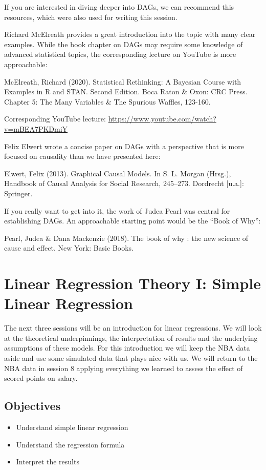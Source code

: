 \documentclass[
]{book}
\providecommand{\tightlist}{%
  \setlength{\itemsep}{0pt}\setlength{\parskip}{0pt}}
\begin{document}
If you are interested in diving deeper into DAGs, we can recommend this
resources, which were also used for writing this session.

Richard McElreath provides a great introduction into the topic with many clear
examples. While the book chapter on DAGs may require some knowledge of advanced
statistical topics, the corresponding lecture on YouTube is more approachable:

McElreath, Richard (2020). Statistical Rethinking: A Bayesian Course with
Examples in R and STAN. Second Edition. Boca Raton \& Oxon: CRC Press.
Chapter 5: The Many Variables \& The Spurious Waffles, 123-160.

Corresponding YouTube lecture: \url{https://www.youtube.com/watch?v=mBEA7PKDmiY}

Felix Elwert wrote a concise paper on DAGs with a perspective that is more
focused on causality than we have presented here:

Elwert, Felix (2013). Graphical Causal Models. In S. L. Morgan (Hrsg.), Handbook
of Causal Analysis for Social Research, 245--273. Dordrecht {[}u.a.{]}: Springer.

If you really want to get into it, the work of Judea Pearl was central for
establishing DAGs. An approachable starting point would be the ``Book of Why'':

Pearl, Judea \& Dana Mackenzie (2018). The book of why : the new science of cause
and effect. New York: Basic Books.

\hypertarget{lin-t-1}{%
\chapter{Linear Regression Theory I: Simple Linear Regression}\label{lin-t-1}}

The next three sessions will be an introduction for linear regressions.
We will look at the theoretical underpinnings, the interpretation of results
and the underlying assumptions of these models. For this introduction we will
keep the NBA data aside and use some simulated data that plays nice with us.
We will return to the NBA data in session 8 applying everything we
learned to assess the effect of scored points on salary.

\hypertarget{objectives-3}{%
\section{Objectives}\label{objectives-3}}

\begin{itemize}
\tightlist
\item
  Understand simple linear regression
\item
  Understand the regression formula
\item
  Interpret the results
\end{itemize}
\end{document}
